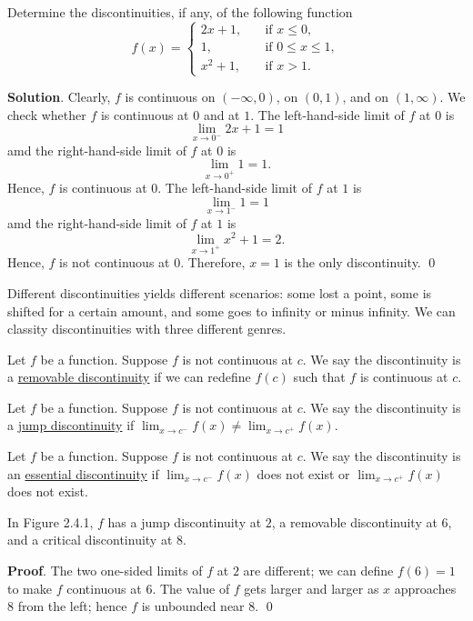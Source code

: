 \documentclass[11pt]{book}
\theoremstyle{break}
\theoremstyle{no_label}
\numberwithin{equation}{section}
\begin{document}
\begin{example}
    Determine the discontinuities, if any, of the following function $$f(x)=\left\{\begin{array}{rl}
        2x+1,\quad & \text{if $x\leq 0$},\\
        1, \quad & \text{if $0\leq x\leq 1$},\\
        x^2+1, \quad & \text{if $x>1$}.
    \end{array}\right.$$
\end{example}
\textbf{Solution}. Clearly, $f$ is continuous on $(-\infty, 0)$, on $(0, 1)$, and on $(1, \infty)$. We check whether $f$ is continuous at $0$ and at $1$. The left-hand-side limit of $f$ at $0$ is $$\lim_{x\to 0^-}2x+1=1$$ amd the right-hand-side limit of $f$ at $0$ is $$\lim_{x\to 0^+}1=1.$$ Hence, $f$ is continuous at $0$. The left-hand-side limit of $f$ at $1$ is $$\lim_{x\to 1^-}1=1$$ amd the right-hand-side limit of $f$ at $1$ is $$\lim_{x\to 1^+}x^2+1=2.$$ Hence, $f$ is not continuous at $0$. Therefore, $x=1$ is the only discontinuity. \qed

Different discontinuities yields different scenarios: some lost a point, some is shifted for a certain amount, and some goes to infinity or minus infinity. We can classity discontinuities with three different genres.

\begin{definition}
    Let $f$ be a function. Suppose $f$ is not continuous at $c$. We say the discontinuity is a \underline{removable discontinuity} if we can redefine $f(c)$ such that $f$ is continuous at $c$.
\end{definition}

\begin{definition}
    Let $f$ be a function. Suppose $f$ is not continuous at $c$. We say the discontinuity is a \underline{jump discontinuity} if $\displaystyle\lim_{x\to c^-}f(x)\ne\lim_{x\to c^+}f(x)$.
\end{definition}

\begin{definition}
    Let $f$ be a function. Suppose $f$ is not continuous at $c$. We say the discontinuity is an \underline{essential discontinuity} if $\displaystyle\lim_{x\to c^-}f(x)$ does not exist or $\displaystyle\lim_{x\to c^+}f(x)$ does not exist.
\end{definition}

\begin{example}
    In Figure 2.4.1, $f$ has a jump discontinuity at $2$, a removable discontinuity at $6$, and a critical discontinuity at $8$.
\end{example}
\textbf{Proof}. The two one-sided limits of $f$ at $2$ are different; we can define $f(6)=1$ to make $f$ continuous at $6$. The value of $f$ gets larger and larger as $x$ approaches $8$ from the left; hence $f$ is unbounded near $8$. \qed 
\end{document}

